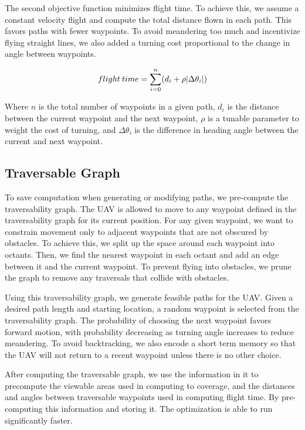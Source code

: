 \documentclass[letterpaper, 10 pt, conference]{ieeeconf}  %
\begin{document}
The second objective function minimizes flight time. To achieve this, we assume a constant velocity flight and compute the total distance flown in each path. This favors paths with fewer waypoints. To avoid meandering too much and incentivize flying straight lines, we also added a turning cost proportional to the change in angle between waypoints.

\begin{equation}%
    flight\: time = \sum_{i=0}^{n} (d_i + \rho\abs{\Delta \theta_i})
\end{equation}

Where $n$ is the total number of waypoints in a given path, $d_i$ is the distance between the current waypoint and the next waypoint, $\rho$ is a tunable parameter to weight the cost of turning, and $\Delta \theta_i$ is the difference in heading angle between the current and next waypoint.

\subsection{Traversable Graph}

To save computation when generating or modifying paths, we pre-compute the traversability graph. The UAV is allowed to move to any waypoint defined in the traversability graph for its current position. For any given waypoint, we want to constrain movement only to adjacent waypoints that are not obscured by obstacles. To achieve this, we split up the space around each waypoint into octants. Then, we find the nearest waypoint in each octant and add an edge between it and the current waypoint. To prevent flying into obstacles, we prune the graph to remove any traversals that collide with obstacles.

Using this traversability graph, we generate feasible paths for the UAV. Given a desired path length and starting location, a random waypoint is selected from the traversability graph. The probability of choosing the next waypoint favors forward motion, with probability decreasing as turning angle increases to reduce meandering. To avoid backtracking, we also encode a short term memory so that the UAV will not return to a recent waypoint unless there is no other choice.

After computing the traversable graph, we use the information in it to precompute the viewable areas used in computing to coverage, and the distances and angles between traversable waypoints used in computing flight time. By pre-computing this information and storing it. The optimization is able to run significantly faster.
\end{document}
